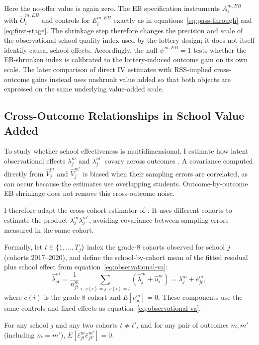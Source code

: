 \documentclass[a4paper, article, english, oneside, unknownkeysallowed, 12pt]{memoir}
\begin{document}
Here the no-offer value is again zero. The EB specification instruments $A_i^{m,EB}$
with $\widetilde O_i^{m,EB}$ and controls for $E_i^{m,EB}$ exactly as in
equations~\eqref{eq:pass-through} and \eqref{eq:first-stage}.
The shrinkage step therefore changes the precision and scale of the observational school-quality index used by the lottery design; it does not itself identify causal school effects.
Accordingly, the null $\psi^{m,EB}=1$ tests whether the EB-shrunken index is calibrated to the lottery-induced outcome gain on its own scale.
The later comparison of direct IV estimates with RSS-implied cross-outcome gains instead uses unshrunk value added so that both objects are expressed on the same underlying value-added scale.


\subsection{Cross-Outcome Relationships in School Value Added}

To study whether school effectiveness is multidimensional, I estimate how latent
observational effects $\lambda_j^m$ and $\lambda_j^{m'}$ covary across outcomes
\parencite{jackson_what_2018, rose_effects_2022}. A covariance computed directly from
$\widehat V_j^m$ and $\widehat V_j^{m'}$ is biased when their sampling errors are correlated,
as can occur because the estimates use overlapping students. Outcome-by-outcome EB
shrinkage does not remove this cross-outcome noise.

I therefore adapt the cross-cohort estimator of \textcite{rose_effects_2022}. It uses
different cohorts to estimate the product $\lambda_j^m\lambda_j^{m'}$, avoiding covariance
between sampling errors measured in the same cohort.

Formally, let $t \in \{1,\ldots,T_j\}$ index the grade-8 cohorts observed for school $j$ (cohorts 2017--2020), and define the school-by-cohort mean of the fitted residual plus school effect from equation~\eqref{eq:observational-va}:
\begin{equation}
  \widehat\lambda_{jt}^m = \frac{1}{n_{jt}^m}\sum_{i:\, s(i)=j,\, c(i)=t} \left(\widehat\lambda_j^m + \widehat u_i^m\right) = \lambda_j^m + \bar e_{jt}^m,
  \label{eq:varcov-cell-mean}
\end{equation}
where $c(i)$ is the grade-8 cohort and $E[\bar e_{jt}^m]=0$. These components use the
same controls and fixed effects as equation~\eqref{eq:observational-va}.

\begin{assumption}
  For any school $j$ and any two cohorts $t\neq t'$, and for any pair of outcomes $m, m'$ (including $m=m'$),
  $E\left[\bar e_{jt}^m \bar e_{jt'}^{m'}\right]=0$.
  \label{as:cross-cohort}
\end{assumption}
\end{document}
